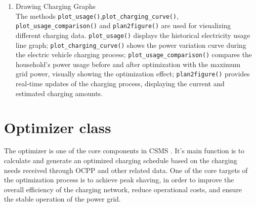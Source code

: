 \documentclass[
english,
ruledheaders=section,%
class=report,%
thesis={type=Report},%
accentcolor=9c,%
custommargins=true,%
marginpar=false,%
parskip=half-,%
fontsize=11pt,%
logofile={img/tuda_logo.pdf}, %
]{tudapub}
\begin{document}
\begin{enumerate}

        \item Drawing Charging Graphs\\
        The methods \texttt{plot\_usage()},\texttt{plot\_charging\_curve()},\\\texttt{plot\_usage\_comparison()} and \texttt{plan2figure()} are used for visualizing different charging data. \texttt{plot\_usage()} displays the historical electricity usage line graph; \texttt{plot\_charging\_curve()} shows the power variation curve during the electric vehicle charging process; \texttt{plot\_usage\_comparison()} compares the household's power usage before and after optimization with the maximum grid power, visually showing the optimization effect; \texttt{plan2figure()} provides real-time updates of the charging process, displaying the current and estimated charging amounts.


    \end{enumerate}

    \section{Optimizer class}
    \label{sec:Optimizer}

    The optimizer is one of the core components in CSMS . It's main function is to calculate and generate an optimized charging schedule based on the charging needs received through OCPP and other related data. One of the core targets of the optimization process is to achieve peak shaving, in order to improve the overall efficiency of the charging network, reduce operational costs, and ensure the stable operation of the power grid.
\end{document}
